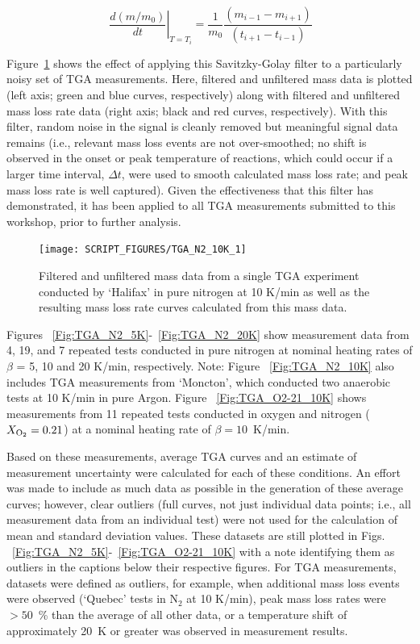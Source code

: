 \documentclass{book}
\begin{document}
\begin{equation}
   \left.\ \frac{d\left(m/m_0\right)}{dt}\right|_{T=T_i}=\frac{1}{m_0}\frac{\left(m_{i-1}-m_{i+1}\right)}{\left(t_{i+1}-t_{i-1}\right)}
\end{equation}

Figure~\ref{Fig:TGA_N2_10K_1} shows the effect of applying this Savitzky-Golay filter to a particularly noisy set of TGA measurements. Here, filtered and unfiltered mass data is plotted (left axis; green and blue curves, respectively) along with filtered and unfiltered mass loss rate data (right axis; black and red curves, respectively). With this filter, random noise in the signal is cleanly removed but meaningful signal data remains (i.e., relevant mass loss events are not over-smoothed; no shift is observed in the onset or peak temperature of reactions, which could occur if a larger time interval, $\Delta t$, were used to smooth calculated mass loss rate; and peak mass loss rate is well captured). Given the effectiveness that this filter has demonstrated, it has been applied to all TGA measurements submitted to this workshop, prior to further analysis.

\begin{figure}
  \centering
  \texttt{[image: SCRIPT\_FIGURES/TGA\_N2\_10K\_1]}
  \caption{Filtered and unfiltered mass data from a single TGA experiment conducted by ‘Halifax’ in pure nitrogen at 10 K/min as well as the resulting mass loss rate curves calculated from this mass data.}
  \label{Fig:TGA_N2_10K_1}
\end{figure}

Figures ~\ref{Fig:TGA_N2_5K}-~\ref{Fig:TGA_N2_20K} show measurement data from 4, 19, and 7 repeated tests conducted in pure nitrogen at nominal heating rates of $\beta$ = 5, 10 and 20 K/min, respectively. Note: Figure ~\ref{Fig:TGA_N2_10K} also includes TGA measurements from ‘Moncton’, which conducted two anaerobic tests at 10 K/min in pure Argon. Figure ~\ref{Fig:TGA_O2-21_10K} shows measurements from 11 repeated tests conducted in oxygen and nitrogen ($X_{\rm O_2}=0.21$) at a nominal heating rate of $\beta=10$~K/min.

Based on these measurements, average TGA curves and an estimate of measurement uncertainty were calculated for each of these conditions. An effort was made to include as much data as possible in the generation of these average curves; however, clear outliers (full curves, not just individual data points; i.e., all measurement data from an individual test) were not used for the calculation of mean and standard deviation values. These datasets are still plotted in Figs. ~\ref{Fig:TGA_N2_5K}-~\ref{Fig:TGA_O2-21_10K} with a note identifying them as outliers in the captions below their respective figures. For TGA measurements, datasets were defined as outliers, for example, when additional mass loss events were observed (‘Quebec’ tests in N$_2$ at 10 K/min), peak mass loss rates were $>50$~\% than the average of all other data, or a temperature shift of approximately 20~K or greater was observed in measurement results.
\end{document}

